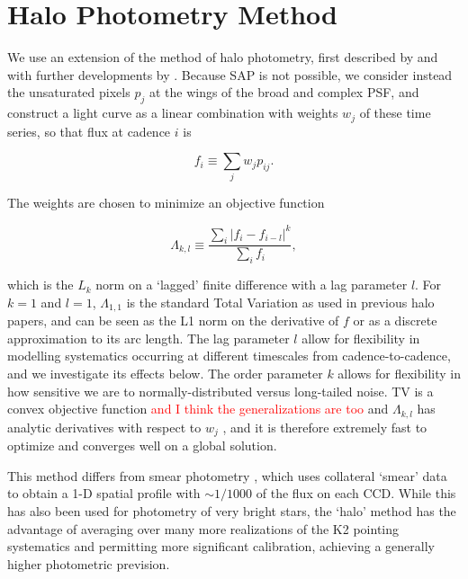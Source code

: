 \documentclass[modern]{aastex62}
\begin{document}
\section{Halo Photometry Method}
\label{method}


We use an extension of the method of halo photometry, first described by \citet{White2017} and with further developments by \citet{Farr2018}. Because SAP is not possible, we consider instead the unsaturated pixels $p_j$ at the wings of the broad and complex PSF, and construct a light curve as a linear combination with weights $w_j$ of these time series, so that flux at cadence $i$ is 

\begin{equation}
    f_i \equiv \sum_j {w_j p_{ij}}.
\end{equation}

\noindent The weights are chosen to minimize an objective function

\begin{equation}
    \Lambda_{k,l} \equiv \frac{\sum_i{|f_i - f_{i-l}|^k}}{\sum_i {f_i}},
\end{equation}

\noindent which is the $L_k$ norm on a `lagged' finite difference with a lag parameter $l$. For $k = 1$ and $l = 1$, $\Lambda_{1,1}$ is the standard Total Variation as used in previous halo papers, and can be seen as the L1 norm on the derivative of $f$ or as a discrete approximation to its arc length. The lag parameter $l$ allow for flexibility in modelling systematics occurring at different timescales from cadence-to-cadence, and we investigate its effects below. The order parameter $k$ allows for flexibility in how sensitive we are to normally-distributed versus long-tailed noise. TV is a convex objective function \textcolor{red}{and I think the generalizations are too} and $\Lambda_{k,l}$ has analytic derivatives with respect to $w_j$ \citep[calculated with \texttt{autograd}][]{autograd}, and it is therefore extremely fast to optimize and converges well on a global solution.

This method differs from smear photometry \citep{Pope2016}, which uses collateral `smear' data to obtain a 1-D spatial profile with $\sim 1/1000$ of the flux on each CCD. While this has also been used for photometry of very bright stars, the `halo' method has the advantage of averaging over many more realizations of the K2 pointing systematics and permitting more significant calibration, achieving a generally higher photometric prevision.
\end{document}

